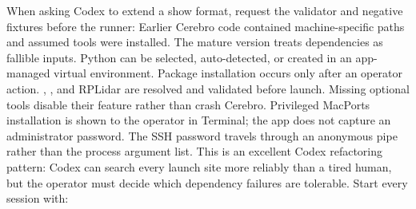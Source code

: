 {}When asking Codex to extend a show format, request the validator and negative\markdownRendererSoftLineBreak
{}fixtures before the runner:\markdownRendererInterblockSeparator
{}\markdownRendererInterblockSeparator
{}\markdownRendererThematicBreak{}\markdownRendererInterblockSeparator
{}
\markdownRendererSectionEnd \markdownRendererSectionBegin
{}\markdownRendererInterblockSeparator
{}Earlier Cerebro code contained machine-specific paths and assumed tools were\markdownRendererSoftLineBreak
{}installed. The mature version treats dependencies as fallible inputs.\markdownRendererParagraphSeparator
{}Python can be selected, auto-detected, or created in an app-managed virtual\markdownRendererSoftLineBreak
{}environment. Package installation occurs only after an operator action.\markdownRendererSoftLineBreak
{}, , and RPLidar are resolved and validated before launch.\markdownRendererSoftLineBreak
{}Missing optional tools disable their feature rather than crash Cerebro.\markdownRendererSoftLineBreak
{}Privileged MacPorts installation is shown to the operator in Terminal; the app\markdownRendererSoftLineBreak
{}does not capture an administrator password. The SSH password travels through an\markdownRendererSoftLineBreak
{}anonymous pipe rather than the process argument list.\markdownRendererParagraphSeparator
{}This is an excellent Codex refactoring pattern:\markdownRendererInterblockSeparator
{}\markdownRendererInterblockSeparator
{}Codex can search every launch site more reliably than a tired human, but the\markdownRendererSoftLineBreak
{}operator must decide which dependency failures are tolerable.\markdownRendererInterblockSeparator
{}\markdownRendererThematicBreak{}\markdownRendererInterblockSeparator
{}
\markdownRendererSectionEnd \markdownRendererSectionBegin
{}\markdownRendererInterblockSeparator
{}\markdownRendererSectionBegin
{}\markdownRendererInterblockSeparator
{}Start every session with:\markdownRendererInterblockSeparator
{}\markdownRendererInterblockSeparator
